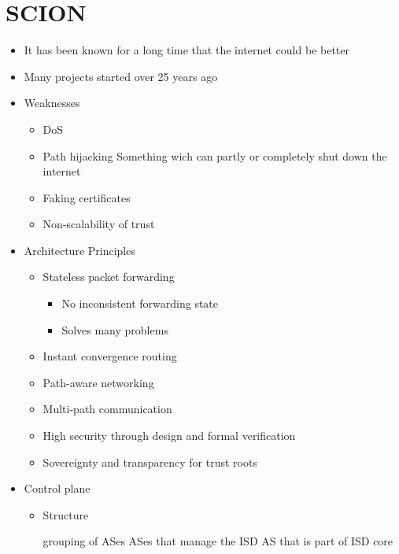
\section{SCION} 
\begin{itemize}
    \item It has been known for a long time that the internet could be better
    \item Many projects started over 25 years ago
    \item Weaknesses
        \begin{itemize}
            \item DoS
            \item Path hijacking
             Something wich can partly or completely shut down the internet
            \item Faking certificates
            \item Non-scalability of trust
        \end{itemize}
    \item Architecture Principles
        \begin{itemize}
            \item Stateless packet forwarding
                \begin{itemize}
                    \item No inconsistent forwarding state
                    \item Solves many problems
                \end{itemize}
            \item Instant convergence routing
            \item Path-aware networking
            \item Multi-path communication
            \item High security through design and formal verification
            \item Sovereignty and transparency for trust roots
        \end{itemize}
    \item Control plane
        \begin{itemize}
            \item Structure
                \begin{itemize}
                     grouping of ASes
                     ASes that manage the ISD
                     AS that is part of ISD core

\end{itemize}
\end{itemize}
\end{itemize}
